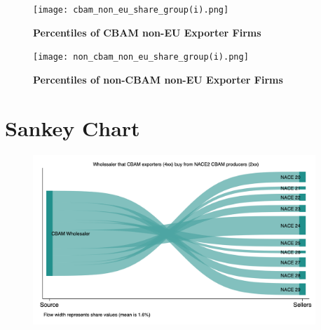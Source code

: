 \documentclass{article}
\begin{document}
\begin{figure}[H]
\centering
\texttt{[image: cbam\_non\_eu\_share\_group(i).png]}
\caption{\textbf{Percentiles of CBAM non-EU Exporter Firms}}
\texttt{[image: non\_cbam\_non\_eu\_share\_group(i).png]}
\caption{\textbf{Percentiles of non-CBAM non-EU Exporter Firms}}
\end{figure}

\section{Sankey Chart}
\begin{figure}[H]
\centering
\includegraphics[width=0.95\textwidth]{sankey_cbam_to_nace.png}
\caption{\textbf{}}
\end{figure}
\end{document}
